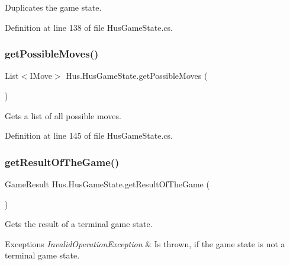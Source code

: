 Duplicates the game state. 



Definition at line 138 of file Hus\+Game\+State.\+cs.

\mbox{\label{class_hus_1_1_hus_game_state_a9fb13d159808e73e86e0c12b4e0dee67}} 
\subsubsection{\texorpdfstring{get\+Possible\+Moves()}{getPossibleMoves()}}
{\footnotesize\ttfamily List$<$I\+Move$>$ Hus.\+Hus\+Game\+State.\+get\+Possible\+Moves (\begin{DoxyParamCaption}{ }\end{DoxyParamCaption})}



Gets a list of all possible moves. 



Definition at line 145 of file Hus\+Game\+State.\+cs.

\mbox{\label{class_hus_1_1_hus_game_state_aa42355269a96c5df1b46d031548d6e0a}} 
\subsubsection{\texorpdfstring{get\+Result\+Of\+The\+Game()}{getResultOfTheGame()}}
{\footnotesize\ttfamily Game\+Result Hus.\+Hus\+Game\+State.\+get\+Result\+Of\+The\+Game (\begin{DoxyParamCaption}{ }\end{DoxyParamCaption})}



Gets the result of a terminal game state. 


\begin{DoxyExceptions}{Exceptions}
{\em Invalid\+Operation\+Exception} & Is thrown, if the game state is not a terminal game state.\\
\hline
\end{DoxyExceptions}


